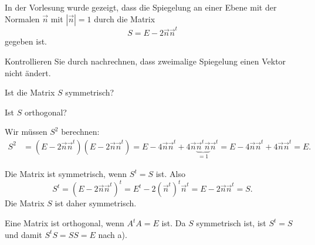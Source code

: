 In der Vorlesung wurde gezeigt, dass die Spiegelung an einer Ebene
mit der Normalen $\vec n$ mit $|\vec n|=1$ durch die Matrix
\[
S=E-2\vec n\vec n^t
\]
gegeben ist.
\begin{teilaufgaben}
\item Kontrollieren Sie durch nachrechnen, dass zweimalige Spiegelung einen
Vektor nicht ändert.
\item Ist die Matrix $S$ symmetrisch?
\item Ist $S$ orthogonal?
\end{teilaufgaben}

\begin{loesung}
\begin{teilaufgaben}
\item
Wir müssen $S^2$ berechnen:
\begin{align*}
S^2
&=
(E-2\vec n\vec n^t) (E-2\vec n\vec n^t)
=
E-4\vec n\vec n^t +4\vec n\underbrace{\vec n^t \vec  n}_{\displaystyle=1}\vec n^t
=
E-4\vec n\vec n^t +4\vec n \vec n^t
=
E.
\end{align*}
\item
Die Matrix ist symmetrisch, wenn $S^t=S$ ist.
Also
\[
S^t
=
(E-2\vec n\vec n^t)^t
=
E^t - 2(\vec n^t)^t\vec n^t
=
E-2\vec n\vec n^t
=
S.
\]
Die Matrix $S$ ist daher symmetrisch.
\item
Eine Matrix ist orthogonal, wenn $A^tA=E$ ist.
Da $S$ symmetrisch ist, ist $S^t=S$ und damit
$S^tS=SS=E$ nach a).
\end{teilaufgaben}
\end{loesung}

